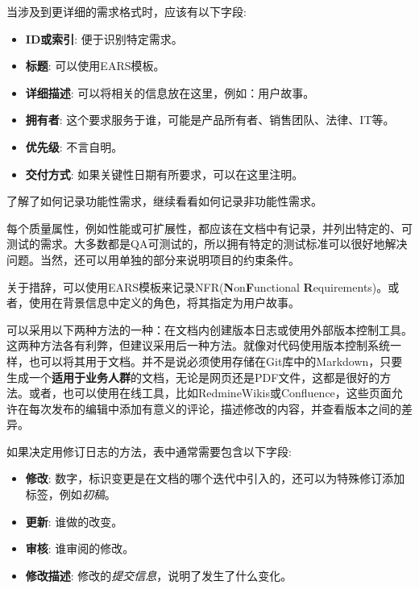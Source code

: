 当涉及到更详细的需求格式时，应该有以下字段:

\begin{itemize}
\item 
\textbf{ID或索引}: 便于识别特定需求。

\item 
\textbf{标题}: 可以使用EARS模板。

\item 
\textbf{详细描述}: 可以将相关的信息放在这里，例如：用户故事。

\item
\textbf{拥有者}: 这个要求服务于谁，可能是产品所有者、销售团队、法律、IT等。

\item
\textbf{优先级}: 不言自明。

\item
\textbf{交付方式}: 如果关键性日期有所要求，可以在这里注明。
\end{itemize}

了解了如何记录功能性需求，继续看看如何记录非功能性需求。


每个质量属性，例如性能或可扩展性，都应该在文档中有记录，并列出特定的、可测试的需求。大多数都是QA可测试的，所以拥有特定的测试标准可以很好地解决问题。当然，还可以用单独的部分来说明项目的约束条件。

关于措辞，可以使用EARS模板来记录NFR(\textbf{N}on\textbf{F}unctional \textbf{R}equirements)。或者，使用在背景信息中定义的角色，将其指定为用户故事。


可以采用以下两种方法的一种：在文档内创建版本日志或使用外部版本控制工具。这两种方法各有利弊，但建议采用后一种方法。就像对代码使用版本控制系统一样，也可以将其用于文档。并不是说必须使用存储在Git库中的Markdown，只要生成一个\textbf{适用于业务人群}的文档，无论是网页还是PDF文件，这都是很好的方法。或者，也可以使用在线工具，比如RedmineWikis或Confluence，这些页面允许在每次发布的编辑中添加有意义的评论，描述修改的内容，并查看版本之间的差异。

如果决定用修订日志的方法，表中通常需要包含以下字段:

\begin{itemize}
\item 
\textbf{修改}: 数字，标识变更是在文档的哪个迭代中引入的，还可以为特殊修订添加标签，例如\textit{初稿}。

\item 
\textbf{更新}: 谁做的改变。

\item 
\textbf{审核}: 谁审阅的修改。

\item
\textbf{修改描述}: 修改的\textit{提交信息}，说明了发生了什么变化。
\end{itemize}


